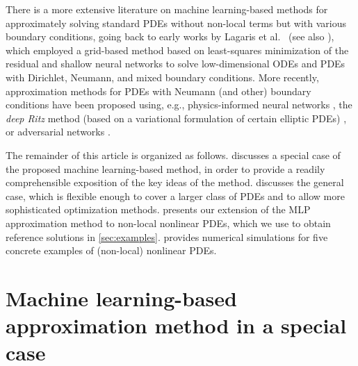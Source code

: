 There is a more extensive literature on machine learning-based methods for approximately solving standard PDEs without non-local terms but with various boundary conditions, going back to early works by Lagaris et al.~\cite{lagaris1998artificial,lagaris2000neural} (see also \cite{mcfall2009artificial}), which employed a grid-based method based on least-squares minimization of the residual and shallow neural networks to solve low-dimensional ODEs and PDEs with Dirichlet, Neumann, and mixed boundary conditions. More recently, approximation methods for PDEs with Neumann (and other) boundary conditions have been proposed using, e.g., physics-informed neural networks \cite{lu2021deepxde,sukumar2022exact,WangPerdikaris2020}, the \emph{deep Ritz} method (based on a variational formulation of certain elliptic PDEs) \cite{e2018deep,liao2021deep,chen2020comparison}, or adversarial networks \cite{zang2020weak}.

The remainder of this article is organized as follows.   discusses a special case of the proposed machine learning-based method, in order to provide a readily comprehensible exposition of the key ideas of the method.  discusses the general case, which is flexible enough to cover a larger class of PDEs and to allow more sophisticated optimization methods.  presents our extension of the MLP approximation method to non-local nonlinear PDEs, which we use to obtain reference solutions in \cref{sec:examples}.  provides numerical simulations for five concrete examples of (non-local) nonlinear PDEs.



\section{Machine learning-based approximation method in a special case}
\label{sec:derivation_spec}

